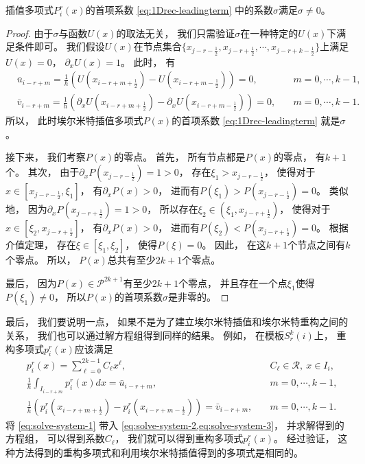 \begin{theorem}
  插值多项式$P^r_i(x)$的首项系数 \cref{eq:1Drec-leadingterm} 中的系数$\sigma$满足$\sigma\neq0$。
\end{theorem}
\begin{proof}
  由于$\sigma$与函数$U(x)$的取法无关，
  我们只需验证$\sigma$在一种特定的$U(x)$下满足条件即可。
  我们假设$U(x)$在节点集合$\{ x_{j-r-\frac 12},x_{j-r+\frac 12},\cdots,x_{j-r+k-\frac 12}\}$上满足$U(x)=0$，
  ${\partial_x}U(x)=1$。
  此时，
  有
  \begin{align}
     & \bar{u}_{i-r+m} = \frac{1}{h}\left(U(x_{i-r+m+\frac{1}{2}}) - U(x_{i-r+m-\frac{1}{2}})\right) = 0, \quad                        & m=0,\cdots,k-1,  \\
     & \bar v_{i-r+m} = \frac{1}{h}\left({\partial_x}U(x_{i-r+m+\frac{1}{2}}) - {\partial_x}U(x_{i-r+m-\frac{1}{2}})\right) = 0, \quad & m=0,\cdots,k-1.
  \end{align}
  所以，
  此时埃尔米特插值多项式$P(x)$的首项系数 \cref{eq:1Drec-leadingterm} 就是$\sigma$。
  
  接下来，
  我们考察$P(x)$的零点。
  首先，
  所有节点都是$P(x)$的零点，
  有$k+1$个。
  其次，
  由于${\partial_x}P(x_{j-r-\frac 12})=1>0$，
  存在$\xi_1>x_{j-r-\frac 12}$，
  使得对于$x\in [x_{j-r-\frac 12},\xi_1]$，
  有${\partial_x}P(x)>0$，
  进而有$P(\xi_1)>P(x_{j-r-\frac 12})=0$。
  类似地，
  因为${\partial_x}P(x_{j-r+\frac 12})=1>0$，
  所以存在$\xi_2\in(\xi_1,x_{j-r+\frac 12})$，
  使得对于$x\in [\xi_2,x_{j-r+\frac 12}]$，
  有${\partial_x}P(x)>0$，
  进而有$P(\xi_2)<P(x_{j-r+\frac 12})=0$。
  根据介值定理，
  存在$\xi\in[\xi_1,\xi_2]$，
  使得$P(\xi)=0$。
  因此，
  在这$k+1$个节点之间有$k$个零点。
  所以，
  $P(x)$总共有至少$2k+1$个零点。
  
  最后，
  因为$P(x)\in\mathcal{P}^{2k+1}$有至少$2k+1$个零点，
  并且存在一个点$\xi_1$使得$P(\xi_1) \neq 0$，
  所以$P(x)$的首项系数$\sigma$是非零的。
\end{proof}

最后，
我们要说明一点，
如果不是为了建立埃尔米特插值和埃尔米特重构之间的关系，
我们也可以通过解方程组得到同样的结果。
例如，
在模板$S^k_r(i)$上，
重构多项式$p^r_i(x)$应该满足
\begin{align}
  \label{eq:solve-system-1}
   & p^r_i(x) = \sum_{\ell=0}^{2k-1} C_\ell x^\ell,
   & C_\ell\in\mathcal{R},~x\in I_i,
  \\\label{eq:solve-system-2}
   & \frac {1}{h} \int_{I_{i-r+m}} p^r_i(x)dx = \bar u_{i-r+m}, \quad
   & m=0,\cdots, k-1,
  \\\label{eq:solve-system-3}
   & \frac {1}{h} \left(p^r_i(x_{i-r+m+\frac{1}{2}}) - p^r_i(x_{i-r+m-\frac{1}{2}})\right) = \bar v_{i-r+m}, \quad
   & m=0,\cdots, k-1.
\end{align}
将 \cref{eq:solve-system-1} 带入 \cref{eq:solve-system-2,eq:solve-system-3}，
并求解得到的方程组，
可以得到系数$C_\ell$，
我们就可以得到重构多项式$p^r_i(x)$。
经过验证，
这种方法得到的重构多项式和利用埃尔米特插值得到的多项式是相同的。

